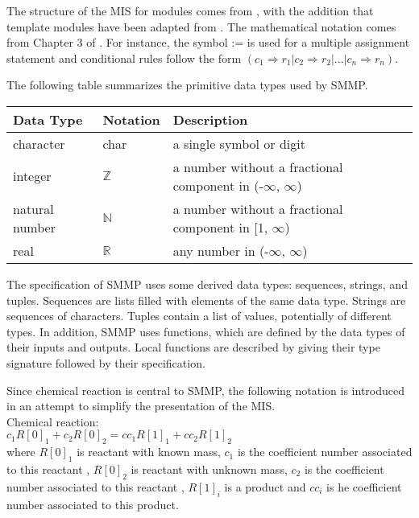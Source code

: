 \documentclass[12pt, titlepage]{article}
\begin{document}
The structure of the MIS for modules comes from \cite{Hoffman:Strooper:1995},
with the addition that template modules have been adapted from
\cite{Ghezzi:Jazayeri:Mandrioli:2003}.  The mathematical notation comes from Chapter 3 of
\cite{Hoffman:Strooper:1995}.  For instance, the symbol := is used for a
multiple assignment statement and conditional rules follow the form $(c_1
\Rightarrow r_1 | c_2 \Rightarrow r_2 | ... | c_n \Rightarrow r_n )$.

The following table summarizes the primitive data types used by SMMP. 

\begin{center}
\renewcommand{\arraystretch}{1.2}
\noindent 
\begin{tabular}{l l p{7.5cm}} 
\toprule 
\textbf{Data Type} & \textbf{Notation} & \textbf{Description}\\ 
\midrule
character & char & a single symbol or digit\\
integer & $\mathbb{Z}$ & a number without a fractional component in (-$\infty$, $\infty$) \\
natural number & $\mathbb{N}$ & a number without a fractional component in [1, $\infty$) \\
real & $\mathbb{R}$ & any number in (-$\infty$, $\infty$)\\
\bottomrule
\end{tabular} 
\end{center}

\noindent
The specification of SMMP  uses some derived data types: sequences, strings, and
tuples. Sequences are lists filled with elements of the same data type. Strings
are sequences of characters. Tuples contain a list of values, potentially of
different types. In addition, SMMP  uses functions, which
are defined by the data types of their inputs and outputs. Local functions are
described by giving their type signature followed by their specification.

\noindent
Since chemical reaction is central to SMMP, the following notation
is introduced in an attempt to simplify the presentation of the MIS.\\

\noindent
Chemical reaction:\\

$c_1R[0]_1 + c_2R[0]_2 = cc_1R[1]_1 + cc_2R[1]_2$\\

where $R[0]_1$ is reactant with known mass, $c_1$ is the coefficient number associated to this reactant ,
$R[0]_2$  is reactant with unknown mass, $c_2$ is the coefficient number associated to this reactant , 
$R[1]_i$ is a product and  $cc_i$ is he coefficient number associated to this product.
\end{document}
